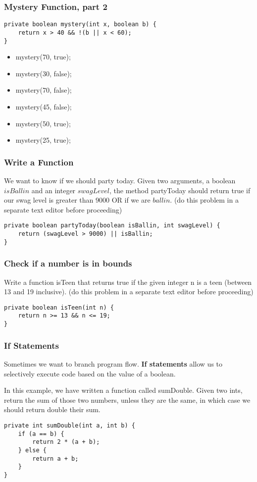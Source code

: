 \documentclass{beamer}
\begin{document}
\begin{frame}[fragile]
\frametitle{Mystery Function, part 2}
\begin{lstlisting}
private boolean mystery(int x, boolean b) {
    return x > 40 && !(b || x < 60);
}
\end{lstlisting}
\begin{itemize}
\item<2->mystery(70, true);
\item<3->mystery(30, false);
\item<4->mystery(70, false);
\item<5->mystery(45, false);
\item<6->mystery(50, true);
\item<7->mystery(25, true);
\end{itemize}
\end{frame}

\begin{frame}[fragile]
\frametitle{Write a Function}
We want to know if we should party today. Given two arguments, a boolean $isBallin$ and an integer $swagLevel$, the method partyToday should return true if our swag level is greater than $9000$ OR if we are $ballin$.
\pause
(do this problem in a separate text editor before proceeding)
\pause
\begin{lstlisting}
private boolean partyToday(boolean isBallin, int swagLevel) {
    return (swagLevel > 9000) || isBallin;
}
\end{lstlisting}
\end{frame}

\begin{frame}[fragile]
\frametitle{Check if a number is in bounds}
Write a function isTeen that returns true if the given integer n is a teen (between 13 and 19 inclusive).
\pause
(do this problem in a separate text editor before proceeding)
\pause
\begin{lstlisting}
private boolean isTeen(int n) {
    return n >= 13 && n <= 19;
}
\end{lstlisting}
\end{frame}

\begin{frame}[fragile]
\frametitle{If Statements}
Sometimes we want to branch program flow. \textbf{If statements} allow us to selectively execute code based on the value of a boolean.
\pause

In this example, we have written a function called sumDouble. Given two ints, return the sum of those two numbers, unless they are the same, in which case we should return double their sum.
\pause
\begin{lstlisting}
private int sumDouble(int a, int b) {
    if (a == b) {
        return 2 * (a + b);
    } else {
        return a + b;
    }
}
\end{lstlisting}
\end{frame}
\end{document}
